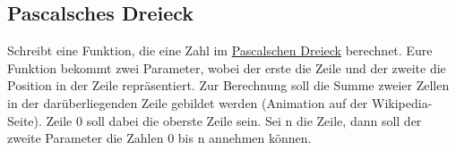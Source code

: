 \subsection{Pascalsches Dreieck }
Schreibt eine Funktion, die eine Zahl im \href{https://de.wikipedia.org/wiki/Pascalsches_Dreieck}{Pascalschen Dreieck}
berechnet. Eure Funktion bekommt zwei Parameter, wobei der erste die Zeile und
der zweite die Position in der Zeile repräsentiert. Zur Berechnung soll die
Summe zweier Zellen in der darüberliegenden Zeile gebildet werden (Animation
auf der Wikipedia-Seite). Zeile 0 soll dabei die oberste Zeile sein. Sei n die
Zeile, dann soll der zweite Parameter die Zahlen 0 bis n annehmen können.

